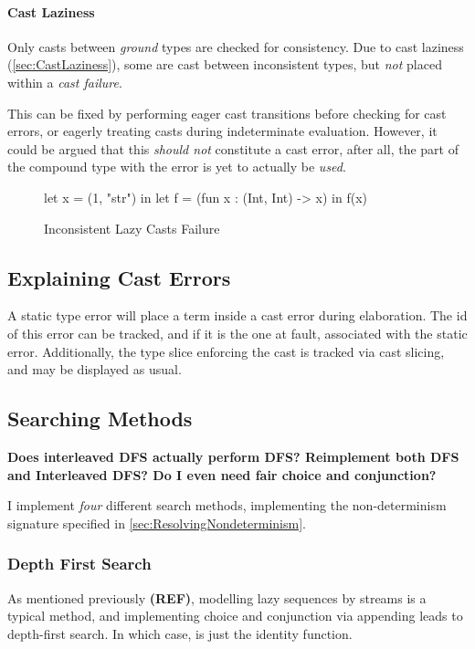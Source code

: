 \paragraph{Cast Laziness}
\label{sec:SearchCastLaziness}
Only casts between \textit{ground} types are checked for consistency. Due to cast laziness (\cref{sec:CastLaziness}), some are cast between inconsistent types, but \textit{not} placed within a \textit{cast failure}.

This can be fixed by performing eager cast transitions before checking for cast errors, or eagerly treating casts during indeterminate evaluation. However, it could be argued that this \textit{should not} constitute a cast error, after all, the part of the compound type with the error is yet to actually be \textit{used}.
\begin{figure}
let x = (1, "str") in 
let f = (fun x : (Int, Int) -> x) 
in f(x)
\caption{Inconsistent Lazy Casts Failure}
\end{figure}

\subsection{Explaining Cast Errors}
\label{sec:StaticCastError}
A static type error will place a term inside a cast error during elaboration. The id of this error can be tracked, and if it is the one at fault, associated with the static error. Additionally, the type slice enforcing the cast is tracked via cast slicing, and may be displayed as usual.

\subsection{Searching Methods}\label{sec:SearchMethods}
\textbf{Does interleaved DFS actually perform DFS? Reimplement both DFS and Interleaved DFS? Do I even need fair choice and conjunction?}

I implement \textit{four} different search methods, implementing the non-determinism signature specified in \cref{sec:ResolvingNondeterminism}.

\subsubsection{Depth First Search}
As mentioned previously \textbf{(REF)}, modelling lazy sequences by streams is a typical method, and implementing choice and conjunction via appending leads to depth-first search. In which case,  is just the identity function.

